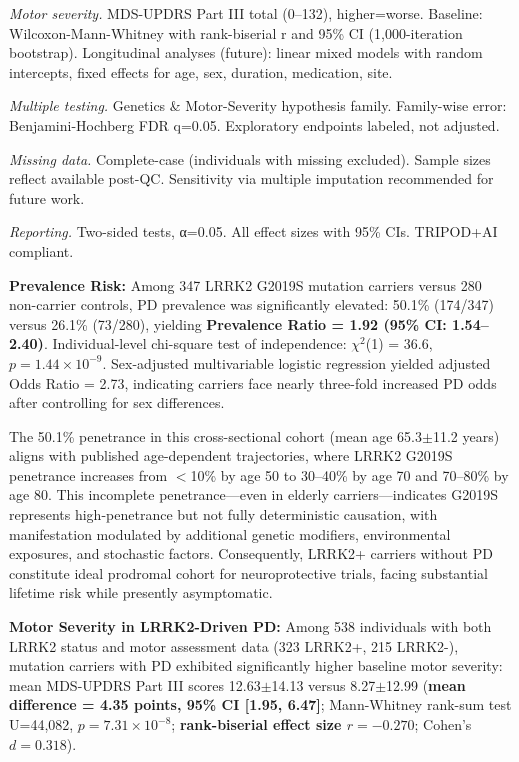 \documentclass[11pt]{article}
\begin{document}
\begin{table}[ht]
\begin{tablenotes}
\item[\textbf{e}] \textit{Motor severity.} MDS-UPDRS Part III\cite{goetz2008movement} total (0--132), higher=worse. Baseline: Wilcoxon-Mann-Whitney with rank-biserial r and 95\% CI (1,000-iteration bootstrap). Longitudinal analyses (future): linear mixed models with random intercepts, fixed effects for age, sex, duration, medication, site.

\item[\textbf{f}] \textit{Multiple testing.} Genetics \& Motor-Severity hypothesis family. Family-wise error: Benjamini-Hochberg FDR q=0.05. Exploratory endpoints labeled, not adjusted.

\item[\textbf{g}] \textit{Missing data.} Complete-case (individuals with missing excluded). Sample sizes reflect available post-QC. Sensitivity via multiple imputation recommended for future work.

\item[\textbf{h}] \textit{Reporting.} Two-sided tests, α=0.05. All effect sizes with 95\% CIs. TRIPOD+AI compliant.
\end{tablenotes}
\end{table}

\textbf{Prevalence Risk:} Among 347 LRRK2 G2019S mutation carriers versus 280 non-carrier controls, PD prevalence was significantly elevated: 50.1\% (174/347) versus 26.1\% (73/280), yielding \textbf{Prevalence Ratio = 1.92 (95\% CI: 1.54--2.40)}. Individual-level chi-square test of independence: $\chi^2$(1) = 36.6, $p = 1.44\times10^{-9}$. Sex-adjusted multivariable logistic regression yielded adjusted Odds Ratio = 2.73, indicating carriers face nearly three-fold increased PD odds after controlling for sex differences.

The 50.1\% penetrance in this cross-sectional cohort (mean age 65.3$\pm$11.2 years) aligns with published age-dependent trajectories\cite{marder2015age}, where LRRK2 G2019S penetrance increases from $<$10\% by age 50 to 30--40\% by age 70 and 70--80\% by age 80. This incomplete penetrance—even in elderly carriers—indicates G2019S represents high-penetrance but not fully deterministic causation, with manifestation modulated by additional genetic modifiers, environmental exposures, and stochastic factors. Consequently, LRRK2+ carriers without PD constitute ideal prodromal cohort for neuroprotective trials, facing substantial lifetime risk while presently asymptomatic.

\textbf{Motor Severity in LRRK2-Driven PD:} Among 538 individuals with both LRRK2 status and motor assessment data (323 LRRK2+, 215 LRRK2-), mutation carriers with PD exhibited significantly higher baseline motor severity: mean MDS-UPDRS Part III\cite{goetz2008movement} scores 12.63$\pm$14.13 versus 8.27$\pm$12.99 (\textbf{mean difference = 4.35 points, 95\% CI [1.95, 6.47]}; Mann-Whitney rank-sum test U=44,082, $p=7.31\times10^{-8}$; \textbf{rank-biserial effect size $r=-0.270$}; Cohen's $d=0.318$).
\end{document}
